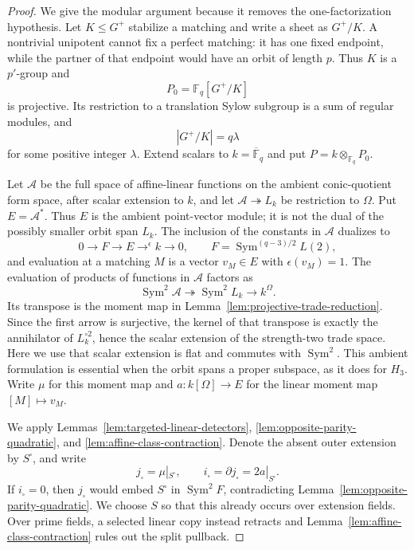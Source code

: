\documentclass[11pt]{article}
\theoremstyle{definition}
\theoremstyle{remark}
\newcommand{\F}{\mathbb{F}}
\begin{document}
\begin{proof}
We give the modular argument because it removes the one-factorization
hypothesis.  Let \(K\leq G^+\) stabilize a matching and write a sheet as
\(G^+/K\).  A nontrivial unipotent cannot fix a perfect matching: it has
one fixed endpoint, while the partner of that endpoint would have an
orbit of length \(p\).  Thus \(K\) is a \(p'\)-group and
\[
 P_0=\F_q[G^+/K]
\]
is projective.  Its restriction to a translation Sylow subgroup is a
sum of regular modules, and
\[
 |G^+/K|=q\lambda                                      \tag{3.2c$_0$}
\]
for some positive integer \(\lambda\).  Extend scalars to
\(k=\overline{\F}_q\) and put \(P=k\otimes_{\F_q}P_0\).

Let \(\mathcal A\) be the full space of affine-linear functions on the
ambient conic-quotient form space, after scalar extension to \(k\), and let
\(\mathcal A\twoheadrightarrow L_k\) be restriction to \(\Omega\).  Put
\(E=\mathcal A^*\).  Thus \(E\) is the ambient point-vector module; it is
not the dual of the possibly smaller orbit span \(L_k\).  The inclusion of
the constants in \(\mathcal A\) dualizes to
\[
 0\longrightarrow F\longrightarrow E
 \mathrel{\mathop{\longrightarrow}^{\epsilon}}k
 \longrightarrow0,\qquad
 F=\operatorname{Sym}^{(q-3)/2}L(2),
                                                               \tag{3.2d}
\]
and evaluation at a matching \(M\) is a vector \(v_M\in E\) with
\(\epsilon(v_M)=1\).  The evaluation of products of functions in
\(\mathcal A\) factors as
\[
 \operatorname{Sym}^2\mathcal A\twoheadrightarrow
 \operatorname{Sym}^2L_k\longrightarrow k^\Omega.
\]
Its transpose is the moment map in
Lemma~\ref{lem:projective-trade-reduction}.  Since the first arrow is
surjective, the kernel of that transpose is exactly the annihilator of
\(L_k^{\circ2}\), hence the scalar extension of the strength-two trade
space.  Here we use that scalar extension is flat and commutes with
\(\operatorname{Sym}^2\).  This ambient formulation is essential when the
orbit spans a proper subspace, as it does for \(H_3\).
Write \(\mu\) for this moment map and
\(a:k[\Omega]\to E\) for the linear moment map
\([M]\mapsto v_M\).

We apply Lemmas~\ref{lem:targeted-linear-detectors},
\ref{lem:opposite-parity-quadratic}, and
\ref{lem:affine-class-contraction}.  Denote the absent outer extension by
\(S^\square\), and write
\[
 j_\square=\mu|_{S^\square},\qquad
 i_\square=\partial j_\square=2a|_{S^\square}.
\]
If \(i_\square=0\), then \(j_\square\) would embed \(S^\square\) in
\(\operatorname{Sym}^2F\), contradicting
Lemma~\ref{lem:opposite-parity-quadratic}.  We choose \(S\) so that this
already occurs over extension fields.  Over prime fields, a selected
linear copy instead retracts and Lemma~\ref{lem:affine-class-contraction}
rules out the split pullback.


\end{proof}
\end{document}
